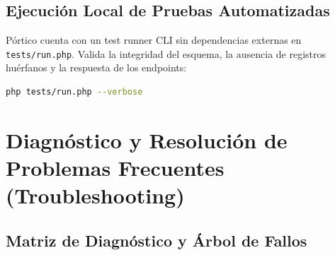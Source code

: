 \documentclass[11pt,a4paper,openany]{report}
\begin{document}
\electricsep

\section{Ejecución Local de Pruebas Automatizadas}

Pórtico cuenta con un test runner CLI sin dependencias externas en \texttt{tests/run.php}. Valida la integridad del esquema, la ausencia de registros huérfanos y la respuesta de los endpoints:
\begin{lstlisting}[language=bash]
php tests/run.php --verbose
\end{lstlisting}

\chapter{Diagnóstico y Resolución de Problemas Frecuentes (Troubleshooting)}

\section{Matriz de Diagnóstico y Árbol de Fallos}
\end{document}

